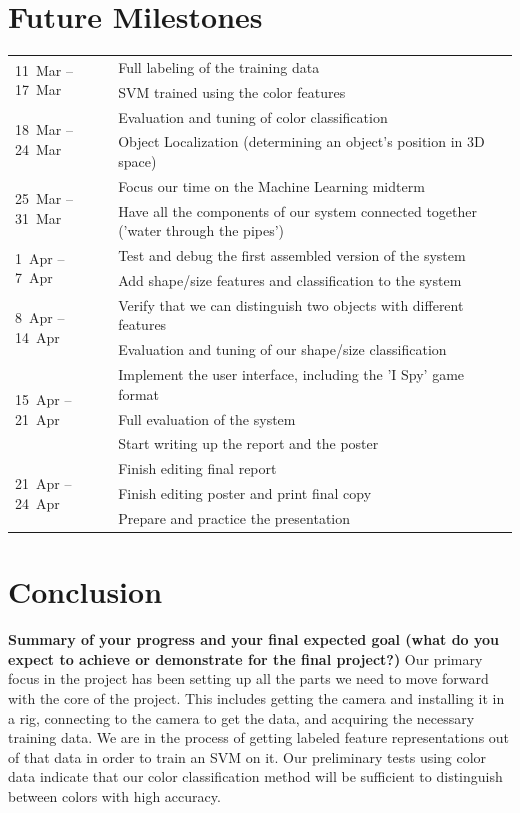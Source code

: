 \documentclass[11pt]{article}
\newcommand{\xxx}[1]{{\bf \color{red} #1}}
\newcommand\T{\rule{0pt}{3ex}}
\newcommand\B{\rule[-1.2ex]{0pt}{0pt}}
\begin{document}
\section{Future Milestones}
\begin{center}
    \begin{tabular}{ | l | l |}
    \hline
    \multirow{2}{*}{11~Mar -- 17~Mar}
	& Full labeling of the training data \T \\
	& SVM trained using the color features \B \\
    \hline
    \multirow{2}{*}{18~Mar -- 24~Mar}
	& Evaluation and tuning of color classification \T \\
	& Object Localization (determining an object's position in 3D space) \B \\
    \hline
    \multirow{2}{*}{25~Mar -- 31~Mar}
	& Focus our time on the Machine Learning midterm \T\\
	& Have all the components of our system connected together ('water through the pipes') \B \\
    \hline
    \multirow{2}{*}{1~Apr -- 7~Apr}
	& Test and debug the first assembled version of the system \T \\
	& Add shape/size features and classification to the system \B\\
    \hline
    \multirow{2}{*}{8~Apr -- 14~Apr}
	& Verify that we can distinguish two objects with different features \T\\
	& Evaluation and tuning of our shape/size classification \B \\
    \hline
    \multirow{3}{*}{15~Apr -- 21~Apr}
	& Implement the user interface, including the 'I Spy' game format \T\\
	& Full evaluation of the system \\
	& Start writing up the report and the poster \B \\
    \hline
    \multirow{3}{*}{21~Apr -- 24~Apr}
	& Finish editing final report \T \\
	& Finish editing poster and print final copy \\
	& Prepare and practice the presentation \B \\
    \hline
    \end{tabular}
\end{center}

\section{Conclusion}
\xxx{Summary of your progress and your final expected goal (what do you expect
    to achieve or demonstrate for the final project?)}
Our primary focus in the project has been setting up all the parts we need to move forward with the core of the project. This includes getting the camera and installing it in a rig, connecting to the camera to get the data, and acquiring the necessary training data. We are in the process of getting labeled feature representations out of that data in order to train an SVM on it. Our preliminary tests using color data indicate that our color classification method will be sufficient to distinguish between colors with high accuracy.
\end{document}
